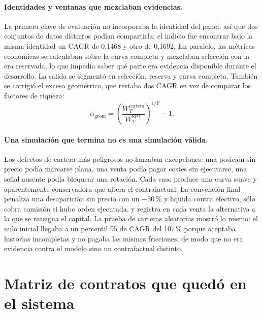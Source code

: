 \paragraph{Identidades y ventanas que mezclaban evidencias.} La primera clave de evaluación no
incorporaba la identidad del panel, así que dos conjuntos de datos distintos podían compartirla; el
indicio fue encontrar bajo la misma identidad un CAGR de 0,1468 y otro de 0,1692. En paralelo, las
métricas económicas se calculaban sobre la curva completa y mezclaban selección con la era
reservada, lo que impedía saber qué parte era evidencia disponible durante el desarrollo. La salida
se segmentó en selección, reserva y curva completa. También se corrigió el exceso geométrico, que
restaba dos CAGR en vez de comparar los factores de riqueza:
\[
 \alpha_{\mathrm{geom}}=
 \left(\frac{W_T^{\mathrm{cartera}}}{W_T^{\mathrm{SPY}}}\right)^{1/Y}-1.
\]

\paragraph{Una simulación que termina no es una simulación válida.} Los defectos de cartera más
peligrosos no lanzaban excepciones: una posición sin precio podía marcarse plana, una venta podía
pagar costes sin ejecutarse, una señal ausente podía bloquear una rotación. Cada caso produce una
curva suave y aparentemente conservadora que altera el contrafactual. La convención final penaliza
una desaparición sin precio con un $-30$\,\% y liquida contra efectivo, sólo cobra comisión si hubo
orden ejecutada, y registra en cada venta la alternativa a la que se reasigna el capital. La prueba
de carteras aleatorias mostró lo mismo: el nulo inicial llegaba a un percentil 95 de CAGR del
107\,\% porque aceptaba historias incompletas y no pagaba las mismas fricciones, de modo que no era
evidencia contra el modelo sino un contrafactual distinto.

\section{Matriz de contratos que quedó en el sistema}

